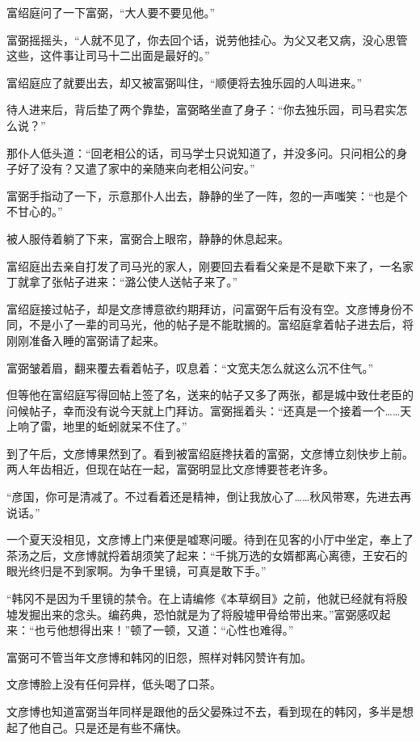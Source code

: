 富绍庭问了一下富弼，“大人要不要见他。”

富弼摇摇头，“人就不见了，你去回个话，说劳他挂心。为父又老又病，没心思管这些，这件事让司马十二出面是最好的。”

富绍庭应了就要出去，却又被富弼叫住，“顺便将去独乐园的人叫进来。”

待人进来后，背后垫了两个靠垫，富弼略坐直了身子：“你去独乐园，司马君实怎么说？”

那仆人低头道：“回老相公的话，司马学士只说知道了，并没多问。只问相公的身子好了没有？又遣了家中的亲随来向老相公问安。”

富弼手指动了一下，示意那仆人出去，静静的坐了一阵，忽的一声嗤笑：“也是个不甘心的。”

被人服侍着躺了下来，富弼合上眼帘，静静的休息起来。

富绍庭出去亲自打发了司马光的家人，刚要回去看看父亲是不是歇下来了，一名家丁就拿了张帖子进来：“潞公使人送帖子来了。”

富绍庭接过帖子，却是文彦博意欲约期拜访，问富弼午后有没有空。文彦博身份不同，不是小了一辈的司马光，他的帖子是不能耽搁的。富绍庭拿着帖子进去后，将刚刚准备入睡的富弼请了起来。

富弼皱着眉，翻来覆去看着帖子，叹息着：“文宽夫怎么就这么沉不住气。”

但等他在富绍庭写得回帖上签了名，送来的帖子又多了两张，都是城中致仕老臣的问候帖子，幸而没有说今天就上门拜访。富弼摇着头：“还真是一个接着一个……天上响了雷，地里的蚯蚓就呆不住了。”

到了午后，文彦博果然到了。看到被富绍庭搀扶着的富弼，文彦博立刻快步上前。两人年齿相近，但现在站在一起，富弼明显比文彦博要苍老许多。

“彦国，你可是清减了。不过看着还是精神，倒让我放心了……秋风带寒，先进去再说话。”

一个夏天没相见，文彦博上门来便是嘘寒问暖。待到在见客的小厅中坐定，奉上了茶汤之后，文彦博就捋着胡须笑了起来：“千挑万选的女婿都离心离德，王安石的眼光终归是不到家啊。为争千里镜，可真是敢下手。”

“韩冈不是因为千里镜的禁令。在上请编修《本草纲目》之前，他就已经就有将殷墟发掘出来的念头。编药典，恐怕就是为了将殷墟甲骨给带出来。”富弼感叹起来：“也亏他想得出来！”顿了一顿，又道：“心性也难得。”

富弼可不管当年文彦博和韩冈的旧怨，照样对韩冈赞许有加。

文彦博脸上没有任何异样，低头喝了口茶。

文彦博也知道富弼当年同样是跟他的岳父晏殊过不去，看到现在的韩冈，多半是想起了他自己。只是还是有些不痛快。

